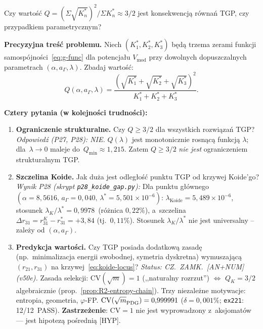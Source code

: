 \begin{problem}\label{oprob:koide}
Czy warto\'s\'c $Q = (\Sigma\sqrt{K^*_n})^2/\Sigma K^*_n \approx 3/2$
jest konsekwencj\k{a} r\'owna\'n TGP, czy przypadkiem parametrycznym?

\medskip
\textbf{Precyzyjna tre\'s\'c problemu.}
Niech $(K^*_1, K^*_2, K^*_3)$ b\k{e}d\k{a} trzema zerami funkcji
samospójno\'sci~\eqref{eq:g-func} dla potencja\l{}u $V_\mathrm{mod}$
przy dowolnych dopuszczalnych parametrach $(\alpha, a_\Gamma, \lambda)$.
Zbadaj warto\'s\'c:
\begin{equation}\label{eq:Q-def-open}
    Q(\alpha, a_\Gamma, \lambda)
    = \frac{(\sqrt{K^*_1}+\sqrt{K^*_2}+\sqrt{K^*_3})^2}
           {K^*_1+K^*_2+K^*_3}.
\end{equation}

\textbf{Cztery pytania (w kolejno\'sci trudno\'sci):}
\begin{enumerate}[label=\textbf{OK-\arabic*}]
    \item \textbf{Ograniczenie strukturalne.}
          Czy $Q \geq 3/2$ dla wszystkich rozwi\k{a}za\'n TGP?
          \textit{Odpowied\'z (P27, P28): NIE.}
          $Q(\lambda)$ jest monotonicznie rosn\k{a}c\k{a}
          funkcj\k{a} $\lambda$; dla~$\lambda \to 0$
          maleje do~$Q_{\min} \approx 1{,}215$. Zatem
          $Q \geq 3/2$ \emph{nie jest} ograniczeniem strukturalnym TGP.

    \item \textbf{Szczelina Koide.}
          Jak du\.za jest odleg\l{}o\'s\'c punktu TGP od krzywej
          Koide'go?
          \textit{Wynik P28 (skrypt \texttt{p28\_koide\_gap.py}):}
          Dla punktu g\l{}\'ownego $(\alpha=8{,}5616,\,
          a_\Gamma=0{,}040,\, \lambda^*=5{,}501\!\times\!10^{-6})$:
          $\lambda_\mathrm{Koide} = 5{,}489\!\times\!10^{-6}$,
          stosunek $\lambda_K/\lambda^* = 0{,}9978$~(r\'o\.znica $0{,}22\%$),
          a~szczelina $\Delta r_{31} = r_{31}^K - r_{31}^* = +3{,}84$
          (tj.\ $0{,}11\%$). Stosunek $\lambda_K/\lambda^*$ nie jest
          universalny -- zale\.zy od $(\alpha, a_\Gamma)$.

    \item \textbf{Predykcja warto\'sci.}
          Czy TGP posiada dodatkow\k{a} zasad\k{e}
          (np.\ minimalizacja energii swobodnej, symetria dyskretna)
          wymuszaj\k{a}c\k{a} $(r_{21}, r_{31})$ na krzywej~\eqref{eq:koide-locus}?
          \textit{Status: CZ.~ZAMK.\ [AN+NUM] (v50e).}
          Zasada selekcji: $\mathrm{CV}(\sqrt{m}) = 1$ (,,naturalny rozrzut'')
          $\Leftrightarrow$ $Q_K = 3/2$ algebraicznie
          (prop.~\ref{prop:R2-entropy-chain}).
          Trzy niezale\.zne motywacje: entropia, geometria, $\varphi$-FP.
          $\mathrm{CV}(\sqrt{m}_{\rm PDG}) = 0{,}999991$ ($\delta = 0{,}001\%$;
          \texttt{ex221}: 12/12~PASS).
          \textbf{Zastrze\.zenie}: $\mathrm{CV} = 1$ nie jest wyprowadzony
          z~aksjomat\'ow --- jest hipotez\k{a} po\'sredni\k{a} [HYP].


\end{enumerate}
\end{problem}
